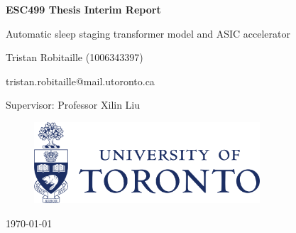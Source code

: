 \documentclass[12pt, hidelinks]{article}
\begin{document}
    \begin{titlepage}
        \centering
        {\LARGE\bfseries ESC499 Thesis Interim Report\par}
        {\Large Automatic sleep staging transformer model and ASIC accelerator\par}
        \vspace*{\fill}
        \vspace{1cm}
        {\Large Tristan Robitaille (1006343397)\par}
        {\large tristan.robitaille@mail.utoronto.ca\par}
        \vspace{1cm}
        {\large Supervisor: Professor Xilin Liu\par}
        \vfill
        \begin{figure}[b]
            \centering
            \includegraphics[width=0.75\textwidth]{assets/UofT_logo.png}
        \end{figure}
        {\large \today\par}
        \thispagestyle{empty}
    \end{titlepage}

    \newpage
    \onehalfspacing %

    \pagestyle{fancy}
    \fancyhf{}
    \renewcommand{\headrulewidth}{0pt} %
    \rfoot{\thepage} %

    \tableofcontents
    \newpage

    \listoffigures

    \listoftables
    \newpage


\end{document}
